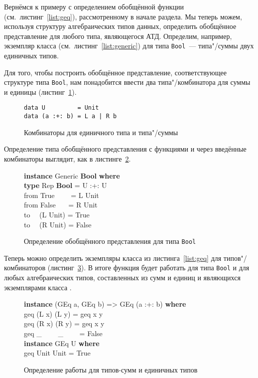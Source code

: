 Вернёмся к примеру с определением обобщённой функции 
(см.~листинг~\ref{list:geq}), рассмотренному в начале раздела. Мы
теперь можем, используя структуру алгебраических типов данных,
определить обобщённое представление для любого типа, являющегося
АТД. Определим, например, экземпляр класса 
(см.~листинг~\ref{list:generic}) для типа
\lstinline{Bool}~--- типа"/суммы двух единичных типов.

Для того, чтобы построить обобщённое представление,
соответствующее структуре типа \lstinline{Bool}, нам понадобится
ввести два типа"/комбинатора для суммы и единицы
(листинг~\ref{list:sum-unit}).
\begin{figure}[h]
\begin{framed}
\vspace{-0.25cm}
\begin{lstlisting}
data U         = Unit
data (a :+: b) = L a | R b
\end{lstlisting}
\vspace{-0.25cm}
\end{framed}
\caption{Комбинаторы для единичного типа и типа"/суммы}
\label{list:sum-unit}
\end{figure}

Определение типа обобщённого представления  с функциями  и  через введённые
комбинаторы выглядит, как в листинге~\ref{list:generic-bool}.
\begin{figure}[h]
\begin{framed}
\ttfamily\small
\textbf{instance} Generic \textbf{Bool} \textbf{where}\\
\ind\textbf{type} Rep \textbf{Bool} = U :+: U\\
\ind from True~~~~ = L Unit\\
\ind from False~~~ = R Unit\\
\ind to~~ (L Unit) = True\\
\ind to~~ (R Unit) = False
\end{framed}
\caption{Определение обобщённого представления для типа \lstinline{Bool}}
\label{list:generic-bool}
\end{figure}

Теперь можно определить экземпляры класса  из
листинга~\ref{list:geq} для типов"/комбинаторов
(листинг~\ref{list:geq-sum-unit}). В итоге функция  будет
работать для типа \lstinline{Bool} и для любых алгебраических типов,
составленных из сумм и единиц и являющихся экземплярами класса
.
\begin{figure}[h]
\begin{framed}
\ttfamily\small
\textbf{instance} (GEq a, GEq b) => GEq (a :+: b) \textbf{where}\\
\ind geq (L x) (L y) = geq x y\\
\ind geq (R x) (R y) = geq x y\\
\ind geq \_~~~~ \_~~~~ = False\\
\textbf{instance} GEq U \textbf{where}\\
\ind geq Unit Unit = True
\end{framed}
\caption{Определение работы  для типов-сумм и единичных типов}
\label{list:geq-sum-unit}
\end{figure}

